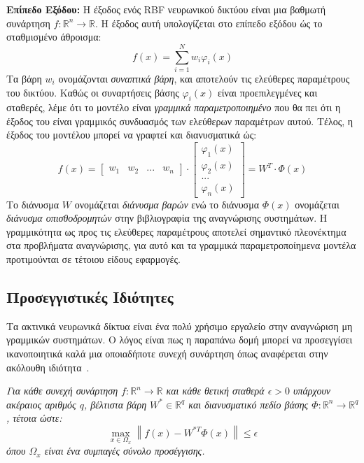 \textbf{Επίπεδο Εξόδου:} Η έξοδος ενός RBF νευρωνικού δικτύου είναι μια βαθμωτή συνάρτηση $f: \mathbb{R}^n \rightarrow \mathbb{R} $. Η έξοδος αυτή υπολογίζεται στο επίπεδο εξόδου ώς το σταθμισμένο άθροισμα:
\begin{equation*}
	f(x) = \sum_{i = 1}^{N} w_i \varphi_i (x)
\end{equation*}
Τα βάρη $w_i$ ονομάζονται \textit{συναπτικά βάρη}, και αποτελούν τις ελεύθερες παραμέτρους του δικτύου. Καθώς οι συναρτήσεις βάσης $\varphi_i(x)$ είναι προεπιλεγμένες και σταθερές, λέμε ότι το μοντέλο είναι \textit{γραμμικά παραμετροποιημένο} που θα πει ότι η έξοδος του είναι γραμμικός συνδυασμός των ελεύθερων παραμέτρων αυτού. Τέλος, η έξοδος του μοντέλου μπορεί να γραφτεί και διανυσματικά ώς:
\begin{equation*}
	f(x) = \begin{bmatrix} w_1 & w_2 & ... & w_n \end{bmatrix} \cdot \begin{bmatrix}
	\varphi_1(x) \\ \varphi_2(x) \\ ... \\ \varphi_n(x)
	\end{bmatrix} = 
	W^T \cdot  \varPhi(x)
\end{equation*}
Το διάνυσμα $W$ ονομάζεται \textit{διάνυσμα βαρών} ενώ το διάνυσμα $\varPhi(x)$ ονομάζεται \textit{διάνυσμα οπισθοδρομητών} στην βιβλιογραφία της αναγνώρισης συστημάτων. Η γραμμικότητα ως προς τις ελεύθερες παραμέτρους αποτελεί σημαντικό πλεονέκτημα στα προβλήματα αναγνώρισης, για αυτό και τα γραμμικά παραμετροποίημενα μοντέλα προτιμούνται σε τέτοιου είδους εφαρμογές.



\subsection{Προσεγγιστικές Ιδιότητες} \label{subsec:rbf_approximation_theorem}
Τα ακτινικά νευρωνικά δίκτυα είναι ένα πολύ χρήσιμο εργαλείο στην αναγνώριση μη γραμμικών συστημάτων. Ο λόγος είναι πως η παραπάνω δομή μπορεί να προσεγγίσει ικανοποιητικά καλά μια οποιαδήποτε συνεχή συνάρτηση όπως αναφέρεται στην ακόλουθη ιδιότητα~\cite{park1991universal}.\\

\begin{theorem}
\textit{Για κάθε συνεχή συνάρτηση $f: \mathbb{R}^n \rightarrow \mathbb{R} $ και κάθε θετική σταθερά $\epsilon > 0$ υπάρχουν ακέραιος αριθμός $q$, βέλτιστα βάρη $W^* \in \mathbb{R}^q$ και διανυσματικό πεδίο βάσης $\varPhi: \mathbb{R}^n \rightarrow \mathbb{R}^q$, τέτοια ώστε:
\begin{equation*}
	\max_{x \in \Omega_x} \left\| f(x) - W^{*T}\varPhi(x) \right\| \leq \epsilon
\end{equation*}
όπου $\Omega_x$ είναι ένα συμπαγές σύνολο προσέγγισης.
}
\end{theorem}


